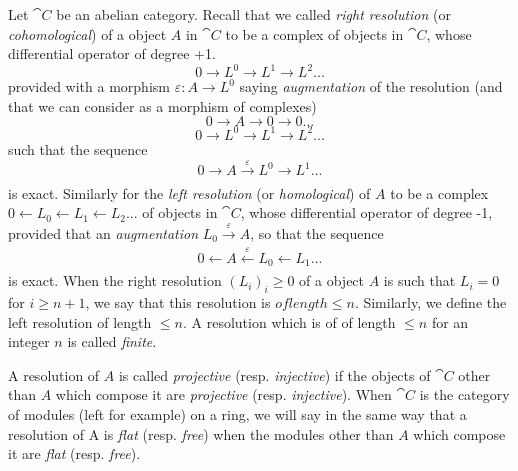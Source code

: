 \begin{env}[11.4.1]
\label{0.11.4.1}
Let $\cat{C}$ be an abelian category.
Recall that we called \emph{right resolution} (or \emph{cohomological}) of a object $A$ in $\cat{C}$ to be
a complex of objects in $\cat{C}$, whose differential operator of degree +1.
\[
  0 \rightarrow L^0 \rightarrow L^1 \rightarrow L^2 ...
\]
provided with a morphism $\varepsilon: A \rightarrow L^0$ saying \emph{augmentation} of the resolution (and that we can consider as a morphism of complexes)
\[
  0 \rightarrow A \rightarrow 0 \rightarrow 0 ...
\]
\[
  0 \rightarrow L^0 \rightarrow L^1 \rightarrow L^2 ...
\]
such that the sequence
\[
  0 \rightarrow A \xrightarrow[]{\varepsilon} L^0 \rightarrow L^1 ...
\]
is exact.
Similarly for the \emph{left resolution} (or \emph{homological}) of $A$ to be a complex $0 \leftarrow L_0 \leftarrow L_1 \leftarrow L_2 ...$
of objects in $\cat{C}$, whose differential operator of degree -1, provided that an \emph{augmentation} $L_0 \xrightarrow[]{\varepsilon} A$, so that the sequence
\[
  0 \leftarrow A \xleftarrow[]{\varepsilon} L_0 \leftarrow L_1 ...
\]
is exact.
When the right resolution $(L_i)_i\geq 0$ of a object $A$ is such that $L_i=0$ for $i\geq n+1$, we say that this resolution is $of length \leq n$.
Similarly, we define the left resolution of length $\leq n$.
A resolution which is of of length $\leq n$ for an integer $n$ is called \emph{finite}.

A resolution of $A$ is called \emph{projective} (resp. \emph{injective}) if the objects of $\cat{C}$ other than $A$ which compose it are \emph{projective} (resp. \emph{injective}). 
When $\cat{C}$ is the category of modules (left for example) on a ring, 
we will say in the same way that a resolution of A is \emph{flat} (resp. \emph{free}) when the modules other than $A$ which compose it are \emph{flat} (resp. \emph{free}).
\end{env}


